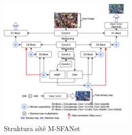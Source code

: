 \begin{figure}[h!]
	\centering
	\includegraphics[width=0.6\textwidth]{Figures/history/MSFANet.png}
	\caption{Struktura sítě M-SFANet \cite{MSFANet_for_crowd_counting}}
	\label{fig:M-SFANet}
\end{figure}











\endinput